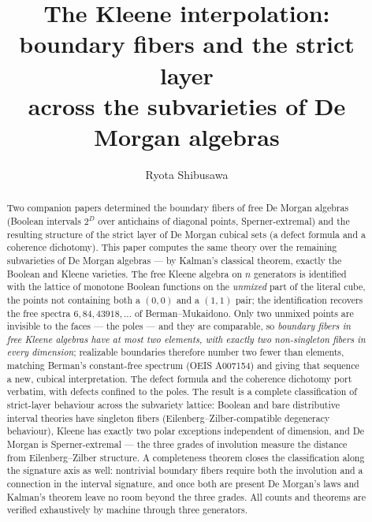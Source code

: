 \documentclass[11pt]{amsart}
\theoremstyle{definition}
\begin{document}
\title[The Kleene interpolation]{The Kleene interpolation:\\
  boundary fibers and the strict layer\\ across the subvarieties of
  De Morgan algebras}

\author{Ryota Shibusawa}
\address{Daiichi Institute of Technology, Japan}


\begin{abstract}
  Two companion papers determined the boundary fibers of free De
  Morgan algebras (Boolean intervals $2^{D}$ over antichains of
  diagonal points, Sperner-extremal) and the resulting structure of
  the strict layer of De Morgan cubical sets (a defect formula and a
  coherence dichotomy).  This paper computes the same theory over
  the remaining subvarieties of De Morgan algebras --- by Kalman's
  classical theorem, exactly the Boolean and Kleene varieties.  The
  free Kleene algebra on $n$ generators is identified with the
  lattice of monotone Boolean functions on the \emph{unmixed} part
  of the literal cube, the points not containing both a $(0,0)$ and
  a $(1,1)$ pair; the identification recovers the free spectra
  $6, 84, 43918, \dots$ of Berman--Mukaidono.  Only two unmixed
  points are invisible to the faces --- the poles --- and they are
  comparable, so \emph{boundary fibers in free Kleene algebras have
  at most two elements, with exactly two non-singleton fibers in
  every dimension}; realizable boundaries therefore number two fewer
  than elements, matching Berman's constant-free spectrum
  (OEIS A007154) and giving that sequence a new, cubical
  interpretation.  The defect formula and the coherence dichotomy
  port verbatim, with defects confined to the poles.  The result is
  a complete classification of strict-layer behaviour across the
  subvariety lattice: Boolean and bare distributive interval
  theories have singleton fibers (Eilenberg--Zilber-compatible
  degeneracy behaviour), Kleene has exactly two polar exceptions
  independent of dimension, and De Morgan is Sperner-extremal ---
  the three grades of involution measure the distance from
  Eilenberg--Zilber structure.  A completeness theorem closes the
  classification along the signature axis as well: nontrivial
  boundary fibers require both the involution and a connection in
  the interval signature, and once both are present De Morgan's laws
  and Kalman's theorem leave no room beyond the three grades.  All
  counts and theorems are verified exhaustively by machine through
  three generators.
\end{abstract}
\end{document}

